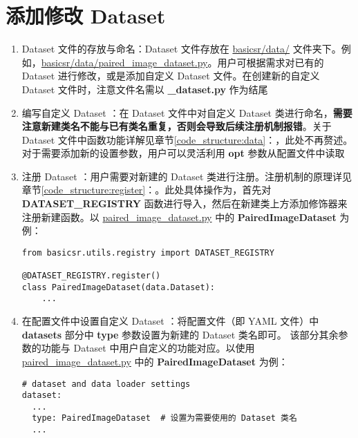 \documentclass[../main.tex]{subfiles}
\begin{document}
\section{添加修改 Dataset}\label{howto:add_dataset}
\begin{enumerate}[第 1 步]
    \item Dataset 文件的存放与命名：Dataset 文件存放在 \href{https://github.com/XPixelGroup/BasicSR/tree/master/basicsr/data}{basicsr/data/} 文件夹下。例如，\href{https://github.com/XPixelGroup/BasicSR/tree/master/basicsr/data}{basicsr/data/paired\_image\_dataset.py}。用户可根据需求对已有的 Dataset 进行修改，或是添加自定义 Dataset 文件。在创建新的自定义 Dataset 文件时，注意文件名需以  \textbf{\_dataset.py} 作为结尾

    \item 编写自定义 Dataset ：在 Dataset 文件中对自定义 Dataset 类进行命名，\textbf{需要注意新建类名不能与已有类名重复，否则会导致后续注册机制报错}。关于 Dataset 文件中函数功能详解见章节\ref{code_structure:data}：，此处不再赘述。对于需要添加新的设置参数，用户可以灵活利用 \textbf{opt} 参数从配置文件中读取

    \item 注册 Dataset ：用户需要对新建的 Dataset 类进行注册。注册机制的原理详见章节\ref{code_structure:register}：。此处具体操作为，首先对 \textbf{DATASET\_REGISTRY} 函数进行导入，然后在新建类上方添加修饰器来注册新建函数。以 \href{https://github.com/XPixelGroup/BasicSR/tree/master/basicsr/data/paired_image_dataset.py}{paired\_image\_dataset.py} 中的 \textbf{PairedImageDataset} 为例：

          \begin{verbatim}
from basicsr.utils.registry import DATASET_REGISTRY

@DATASET_REGISTRY.register()
class PairedImageDataset(data.Dataset):
    ...
\end{verbatim}

    \item 在配置文件中设置自定义 Dataset ：将配置文件（即 YAML 文件）中 \textbf{datasets} 部分中 \textbf{type} 参数设置为新建的 Dataset 类名即可。
          该部分其余参数的功能与 Dataset 中用户自定义的功能对应。以使用 \href{https://github.com/XPixelGroup/BasicSR/tree/master/basicsr/data/paired_image_dataset.py}{paired\_image\_dataset.py} 中的 \textbf{PairedImageDataset} 为例：

          \begin{verbatim}
# dataset and data loader settings
dataset:
  ...
  type: PairedImageDataset  # 设置为需要使用的 Dataset 类名
  ...
\end{verbatim}
\end{enumerate}
\end{document}
